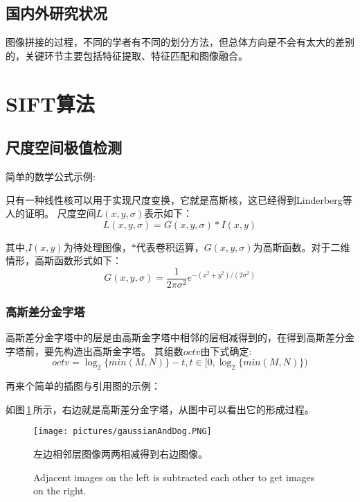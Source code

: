 \documentclass[10.5pt,a4paper]{article}
\numberwithin{equation}{section}
\numberwithin{figure}{section}
\numberwithin{table}{section}
\renewcommand{\figurename}{图}
\begin{document}
\subsection{国内外研究状况}
图像拼接的过程，不同的学者有不同的划分方法，但总体方向是不会有太大的差别的，关键环节主要包括特征提取、特征匹配和图像融合。
\newpage
\section{SIFT算法\label{sectionSift}}

\subsection{尺度空间极值检测}

简单的数学公式示例:\par
只有一种线性核可以用于实现尺度变换，它就是高斯核，这已经得到Linderberg等人的证明\cite{lindeberg1994scale}。
尺度空间$L(x,y,\sigma)$表示如下：
\begin{equation}
L(x,y,\sigma) = G(x,y,\sigma) * I(x,y)
\end{equation}
\par
其中,$I(x,y)$为待处理图像，$*$代表卷积运算，$G(x,y,\sigma)$为高斯函数\cite{lowe2004distinctive}。对于二维情形，高斯函数形式如下：
\begin{equation}
G(x,y,\sigma) = \frac{1}{2\pi\sigma^2}e^{-(x^2+y^2)/(2\sigma^2)}
\end{equation}
\subsubsection{高斯差分金字塔}
\par
高斯差分金字塔中的层是由高斯金字塔中相邻的层相减得到的，在得到高斯差分金字塔前，要先构造出高斯金字塔。
其组数$octv$由下式确定:
\begin{equation}
octv = \log_2\{min(M,N)\}-t, t\in[0,\log_2\{min(M,N)\})
\end{equation}
\par
再来个简单的插图与引用图的示例：\par
如图\,\ref{gaussianAndDog}\,所示，右边就是高斯差分金字塔，从图中可以看出它的形成过程。
\begin{figure}[htbp]
\centering
\texttt{[image: pictures/gaussianAndDog.PNG]}
\caption{左边相邻层图像两两相减得到右边图像\cite{lowe2004distinctive}。\label{gaussianAndDog}}
\addtocounter{figure}{-1}
\renewcommand{\figurename}{Figure}
\caption{Adjacent images on the left is subtracted each other to get images on the right\cite{lowe2004distinctive}.}
\end{figure}
\end{document}

